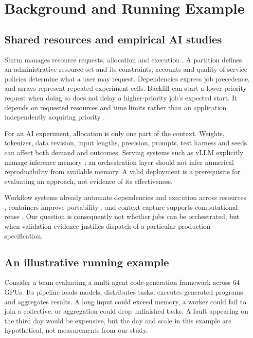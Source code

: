 \documentclass[pdflatex,sn-mathphys-num]{sn-jnl}
\theoremstyle{thmstylethree}
\begin{document}
\section{Background and Running Example}\label{sec:background}
\subsection{Shared resources and empirical AI studies}
Slurm manages resource requests, allocation and execution \cite{yoo2003slurm}. A partition defines an administrative resource set and its constraints; accounts and quality-of-service policies determine what a user may request. Dependencies express job precedence, and arrays represent repeated experiment cells. Backfill can start a lower-priority request when doing so does not delay a higher-priority job's expected start. It depends on requested resources and time limits rather than an application independently acquiring priority \cite{schedmdScheduling}.

For an AI experiment, allocation is only one part of the context. Weights, tokenizer, data revision, input lengths, precision, prompts, test harness and seeds can affect both demand and outcomes. Serving systems such as vLLM explicitly manage inference memory \cite{kwon2023vllm}; an orchestration layer should not infer numerical reproducibility from available memory. A valid deployment is a prerequisite for evaluating an approach, not evidence of its effectiveness.

Workflow systems already automate dependencies and execution across resources \cite{deelman2015pegasus,molder2021snakemake,babuji2019parsl}, containers improve portability \cite{kurtzer2017singularity}, and context capture supports computational reuse \cite{davison2012sumatra,crusoe2022cwl}. Our question is consequently not whether jobs can be orchestrated, but when validation evidence justifies dispatch of a particular production specification.

\subsection{An illustrative running example}
Consider a team evaluating a multi-agent code-generation framework across 64 GPUs. Its pipeline loads models, distributes tasks, executes generated programs and aggregates results. A long input could exceed memory, a worker could fail to join a collective, or aggregation could drop unfinished tasks. A fault appearing on the third day would be expensive, but the day and scale in this example are hypothetical, not measurements from our study.
\end{document}
